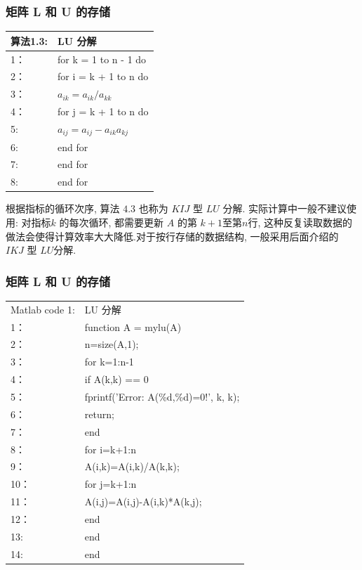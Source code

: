 \documentclass[notheorems,serif]{beamer}
\begin{document}
\begin{frame}
\frametitle{矩阵 L 和 U 的存储}

\begin{table}  
	\begin{tabular*}{16cm}{ll}  
		\hline  
		算法1.3: & LU 分解 \\  
		\hline  
		1：   &for k = 1 to n - 1 do\\  
		2：   &\qquad for i = k + 1 to n do\\
		3：   &\qquad \qquad $a_{ik} = a_{ik}/a_{kk}$\\
		4：   &\qquad \qquad for j = k + 1 to n do\\
		5:    &\qquad \qquad \qquad $a_{ij} = a_{ij} − a_{ik}a_{kj}$\\
		6:    &\qquad \qquad end for\\
		7:    &\qquad end for\\
		8:    &end for \\
		\hline  
	\end{tabular*}  
\end{table} 

\qquad{\red{$\dagger$}} 根据指标的循环次序, 算法 $4.3$ 也称为 $KIJ$ 型 $LU$ 分解. 实际计算中一般不建议使用: 对指标$k$ 的每次循环, 都需要更新 $A$ 的第 $k + 1 $至第$n $行, 这种反复读取数据的做法会使得计算效率大大降低.对于按行存储的数据结构, 一般采用后面介绍的 $IKJ$ 型 $LU$分解.
\end{frame}

\begin{frame}
\frametitle{矩阵 L 和 U 的存储}
\begin{table}  
	\begin{tabular*}{16cm}{ll}  
		\hline  
		Matlab code 1: & LU 分解 \\    
		1：   &function A = mylu(A)\\ 
		2：   &n=size(A,1);\\
		3：   &for k=1:n-1\\
		4：   &\qquad if A(k,k) == 0\\
		5：   &\qquad fprintf('Error: A(\%d,\%d)=0!', k, k);\\
		6：   &\qquad return;\\
		7：   &\qquad end\\
		8：   &\qquad for i=k+1:n\\
		9：   &\qquad \qquad A(i,k)=A(i,k)/A(k,k);\\
		10：   &\qquad \qquad for j=k+1:n\\
		11：   &\qquad \qquad \qquad A(i,j)=A(i,j)-A(i,k)*A(k,j);\\
		12：   &\qquad \qquad end\\
		13:    &\qquad end \\
		14:    &end  \\
		\hline  
	\end{tabular*}  
\end{table}
\end{frame}
\end{document}
